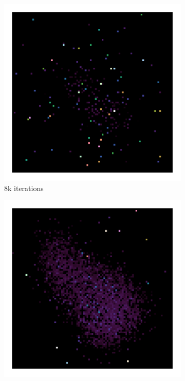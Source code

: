 \begin{figure}[h]
		\centering
	\begin{subfigure}[b]{0.245\linewidth}
		\includegraphics[width=1.00\linewidth, clip, trim= 0.25in 0.25in 0.25in 0.25in]{./chapters/05.pcdm/randomProblem/random_1k_block1.png}
		\caption{8k iterations}
		\label{pcdm:adaption:randomProblem:block11}
	\end{subfigure}
	\begin{subfigure}[b]{0.245\linewidth}
		\includegraphics[width=1.00\linewidth, clip, trim= 0.25in 0.25in 0.25in 0.25in]{./chapters/05.pcdm/randomProblem/random_10k_block1.png}

\end{subfigure}
\end{figure}
